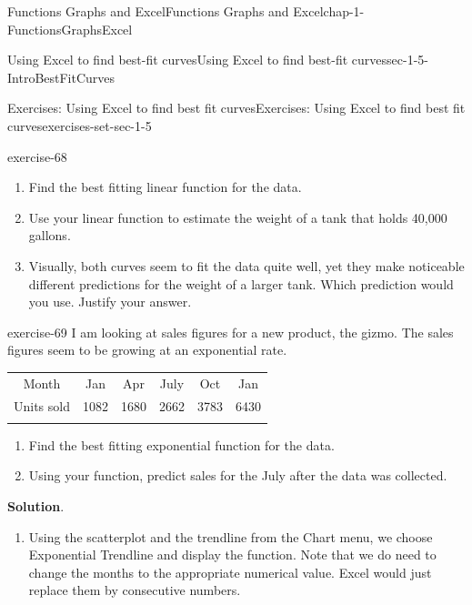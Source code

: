 \documentclass[oneside,10pt,]{book}
\numberwithin{equation}{section}
\newcommand{\hrulethin}  {\noalign{\hrule height 0.04em}}
\newcommand{\hrulemedium}{\noalign{\hrule height 0.07em}}
\newcommand{\hrulethick} {\noalign{\hrule height 0.11em}}
\begin{document}
\begin{chapterptx}{Functions Graphs and Excel}{}{Functions Graphs and Excel}{}{}{chap-1-FunctionsGraphsExcel}
\begin{sectionptx}{Using Excel to find best-fit curves}{}{Using Excel to find best-fit curves}{}{}{sec-1-5-IntroBestFitCurves}
\begin{exercises-subsection-numberless}{Exercises: Using Excel to find best fit curves}{}{Exercises: Using Excel to find best fit curves}{}{}{exercises-set-sec-1-5}
\begin{divisionexercise}{4}{}{}{exercise-68}
\begin{enumerate}[label=(\alph*)]
\item\hypertarget{li-127}{}\hypertarget{p-434}{}%
Find the best fitting linear function for the data.%
\item\hypertarget{li-128}{}\hypertarget{p-435}{}%
Use your linear function to estimate the weight of a tank that holds 40,000 gallons.%
\item\hypertarget{li-129}{}\hypertarget{p-436}{}%
Visually, both curves seem to fit the data quite well, yet they make noticeable different predictions for the weight of a larger tank.  Which prediction would you use.  Justify your answer.%
\end{enumerate}
\end{divisionexercise}%
\begin{divisionexercise}{5}{}{}{exercise-69}%
\hypertarget{p-437}{}%
I am looking at sales figures for a new product, the gizmo.  The sales figures seem to be growing at an exponential rate.%
\begin{sidebyside}{1}{0}{0}{0}%
\begin{sbspanel}{1}%
{\centering%
\begin{tabular}{cccccc}\hrulethick
Month&Jan&Apr&July&Oct&Jan\tabularnewline\hrulethin
Units sold&1082&1680&2662&3783&6430\tabularnewline\hrulemedium
\end{tabular}
\par}
\end{sbspanel}%
\end{sidebyside}%
\leavevmode%
\begin{enumerate}[label=(\alph*)]
\item\hypertarget{li-130}{}\hypertarget{p-438}{}%
Find the best fitting exponential function for the data.%
\item\hypertarget{li-131}{}\hypertarget{p-439}{}%
Using your function, predict sales for the July after the data was collected.%
\end{enumerate}
\par\smallskip%
\noindent\textbf{Solution}.\hypertarget{solution-34}{}\quad%
\leavevmode%
\begin{enumerate}[label=(\alph*)]
\item\hypertarget{li-132}{}\hypertarget{p-440}{}%
Using the scatterplot and the trendline from the Chart menu, we choose Exponential Trendline and display the function. Note that we do need to change the months to the appropriate numerical value. Excel would just replace them by consecutive numbers. \leavevmode%
\begin{sidebyside}{1}{0}{0}{0}%
\begin{sbspanel}{1}%

\end{sbspanel}
\end{sidebyside}
\end{enumerate}
\end{divisionexercise}
\end{exercises-subsection-numberless}
\end{sectionptx}
\end{chapterptx}
\end{document}
